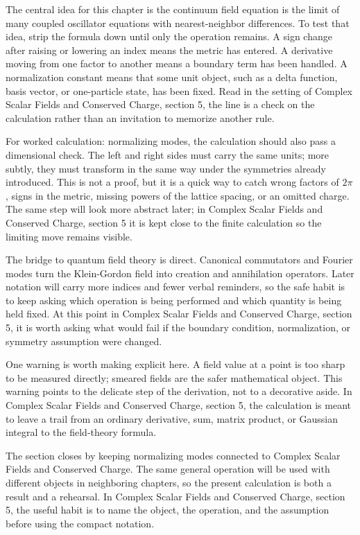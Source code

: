 The central idea for this chapter is the continuum field equation is the limit of many coupled oscillator equations with nearest-neighbor differences.  To test that idea, strip the formula down until only the operation remains.  A sign change after raising or lowering an index means the metric has entered.  A derivative moving from one factor to another means a boundary term has been handled.  A normalization constant means that some unit object, such as a delta function, basis vector, or one-particle state, has been fixed.  Read in the setting of Complex Scalar Fields and Conserved Charge, section 5, the line is a check on the calculation rather than an invitation to memorize another rule.

For worked calculation: normalizing modes, the calculation should also pass a dimensional check.  The left and right sides must carry the same units; more subtly, they must transform in the same way under the symmetries already introduced.  This is not a proof, but it is a quick way to catch wrong factors of \(2\pi\), signs in the metric, missing powers of the lattice spacing, or an omitted charge.  The same step will look more abstract later; in Complex Scalar Fields and Conserved Charge, section 5 it is kept close to the finite calculation so the limiting move remains visible.

The bridge to quantum field theory is direct.  Canonical commutators and Fourier modes turn the Klein-Gordon field into creation and annihilation operators.  Later notation will carry more indices and fewer verbal reminders, so the safe habit is to keep asking which operation is being performed and which quantity is being held fixed.  At this point in Complex Scalar Fields and Conserved Charge, section 5, it is worth asking what would fail if the boundary condition, normalization, or symmetry assumption were changed.

One warning is worth making explicit here.  A field value at a point is too sharp to be measured directly; smeared fields are the safer mathematical object.  This warning points to the delicate step of the derivation, not to a decorative aside.  In Complex Scalar Fields and Conserved Charge, section 5, the calculation is meant to leave a trail from an ordinary derivative, sum, matrix product, or Gaussian integral to the field-theory formula.

The section closes by keeping normalizing modes connected to Complex Scalar Fields and Conserved Charge.  The same general operation will be used with different objects in neighboring chapters, so the present calculation is both a result and a rehearsal.  In Complex Scalar Fields and Conserved Charge, section 5, the useful habit is to name the object, the operation, and the assumption before using the compact notation.



